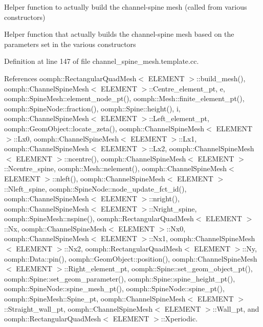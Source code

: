 Helper function to actually build the channel-\/spine mesh (called from various constructors) 

Helper function that actually builds the channel-\/spine mesh based on the parameters set in the various constructors 

Definition at line 147 of file channel\+\_\+spine\+\_\+mesh.\+template.\+cc.



References oomph\+::\+Rectangular\+Quad\+Mesh$<$ E\+L\+E\+M\+E\+N\+T $>$\+::build\+\_\+mesh(), oomph\+::\+Channel\+Spine\+Mesh$<$ E\+L\+E\+M\+E\+N\+T $>$\+::\+Centre\+\_\+element\+\_\+pt, e, oomph\+::\+Spine\+Mesh\+::element\+\_\+node\+\_\+pt(), oomph\+::\+Mesh\+::finite\+\_\+element\+\_\+pt(), oomph\+::\+Spine\+Node\+::fraction(), oomph\+::\+Spine\+::height(), i, oomph\+::\+Channel\+Spine\+Mesh$<$ E\+L\+E\+M\+E\+N\+T $>$\+::\+Left\+\_\+element\+\_\+pt, oomph\+::\+Geom\+Object\+::locate\+\_\+zeta(), oomph\+::\+Channel\+Spine\+Mesh$<$ E\+L\+E\+M\+E\+N\+T $>$\+::\+Lx0, oomph\+::\+Channel\+Spine\+Mesh$<$ E\+L\+E\+M\+E\+N\+T $>$\+::\+Lx1, oomph\+::\+Channel\+Spine\+Mesh$<$ E\+L\+E\+M\+E\+N\+T $>$\+::\+Lx2, oomph\+::\+Channel\+Spine\+Mesh$<$ E\+L\+E\+M\+E\+N\+T $>$\+::ncentre(), oomph\+::\+Channel\+Spine\+Mesh$<$ E\+L\+E\+M\+E\+N\+T $>$\+::\+Ncentre\+\_\+spine, oomph\+::\+Mesh\+::nelement(), oomph\+::\+Channel\+Spine\+Mesh$<$ E\+L\+E\+M\+E\+N\+T $>$\+::nleft(), oomph\+::\+Channel\+Spine\+Mesh$<$ E\+L\+E\+M\+E\+N\+T $>$\+::\+Nleft\+\_\+spine, oomph\+::\+Spine\+Node\+::node\+\_\+update\+\_\+fct\+\_\+id(), oomph\+::\+Channel\+Spine\+Mesh$<$ E\+L\+E\+M\+E\+N\+T $>$\+::nright(), oomph\+::\+Channel\+Spine\+Mesh$<$ E\+L\+E\+M\+E\+N\+T $>$\+::\+Nright\+\_\+spine, oomph\+::\+Spine\+Mesh\+::nspine(), oomph\+::\+Rectangular\+Quad\+Mesh$<$ E\+L\+E\+M\+E\+N\+T $>$\+::\+Nx, oomph\+::\+Channel\+Spine\+Mesh$<$ E\+L\+E\+M\+E\+N\+T $>$\+::\+Nx0, oomph\+::\+Channel\+Spine\+Mesh$<$ E\+L\+E\+M\+E\+N\+T $>$\+::\+Nx1, oomph\+::\+Channel\+Spine\+Mesh$<$ E\+L\+E\+M\+E\+N\+T $>$\+::\+Nx2, oomph\+::\+Rectangular\+Quad\+Mesh$<$ E\+L\+E\+M\+E\+N\+T $>$\+::\+Ny, oomph\+::\+Data\+::pin(), oomph\+::\+Geom\+Object\+::position(), oomph\+::\+Channel\+Spine\+Mesh$<$ E\+L\+E\+M\+E\+N\+T $>$\+::\+Right\+\_\+element\+\_\+pt, oomph\+::\+Spine\+::set\+\_\+geom\+\_\+object\+\_\+pt(), oomph\+::\+Spine\+::set\+\_\+geom\+\_\+parameter(), oomph\+::\+Spine\+::spine\+\_\+height\+\_\+pt(), oomph\+::\+Spine\+Node\+::spine\+\_\+mesh\+\_\+pt(), oomph\+::\+Spine\+Node\+::spine\+\_\+pt(), oomph\+::\+Spine\+Mesh\+::\+Spine\+\_\+pt, oomph\+::\+Channel\+Spine\+Mesh$<$ E\+L\+E\+M\+E\+N\+T $>$\+::\+Straight\+\_\+wall\+\_\+pt, oomph\+::\+Channel\+Spine\+Mesh$<$ E\+L\+E\+M\+E\+N\+T $>$\+::\+Wall\+\_\+pt, and oomph\+::\+Rectangular\+Quad\+Mesh$<$ E\+L\+E\+M\+E\+N\+T $>$\+::\+Xperiodic.



